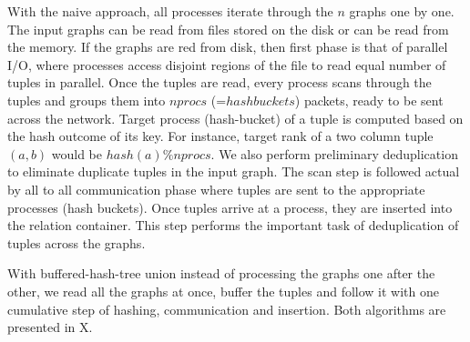 With the naive approach, all processes iterate through the $n$ graphs one by one.
The input graphs can be read from files stored on the disk or can be read from the memory. If the graphs are red from disk, then first phase is that of parallel I/O, where processes access disjoint regions of the file to read equal number of tuples in parallel. Once the tuples are read, every process scans through the tuples and groups them into $nprocs$ (=$hashbuckets$) packets, ready to be sent across the network.
Target process (hash-bucket) of a tuple is computed based on the hash outcome of its key. For instance, target rank of a two column tuple $(a, b)$ would be $hash(a)\%nprocs$. We also perform preliminary deduplication to eliminate duplicate tuples in the input graph. The scan step is followed actual by all to all communication phase where tuples are sent to the appropriate processes (hash buckets). Once tuples arrive at a process, they are inserted into the relation container. This step performs the important task of deduplication of tuples across the graphs. 

With buffered-hash-tree union instead of processing the graphs one after the other, we read all the graphs at once, buffer the tuples and follow it with one cumulative step of hashing, communication and insertion. Both algorithms are presented in X.